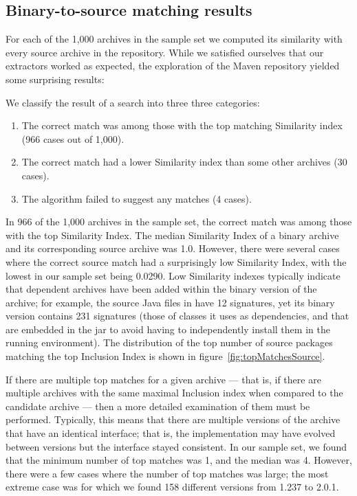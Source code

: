 \subsection{Binary-to-source matching results}

For each of the 1,000 archives in the sample set we computed its similarity
with every source archive in the repository.  While we satisfied ourselves
that our extractors worked as expected, the exploration of the Maven
repository yielded some surprising results:

We classify the result of a search into three three categories:

    \begin{enumerate}
    \item The correct match was among those with the top matching Similarity
	index (966 cases out of 1,000).
    \item The correct match had a lower Similarity index than some
	other archives (30 cases).
    \item The algorithm failed to suggest any matches (4 cases).
    \end{enumerate}

In 966 of the 1,000 archives in the sample set, the correct match was among
those with the top Similarity Index.  The median Similarity Index of a
binary archive and its corresponding source archive was 1.0.  However,
there were several cases where the correct source match had a surprisingly
low Similarity Index, with the lowest in our sample set being 0.0290.  Low
Similarity indexes typically indicate that dependent archives have been
added within the binary version of the archive; for example, the source
Java files in  have 12 signatures, yet
its binary version contains 231 signatures (those of classes it uses as
dependencies, and that are embedded in the jar to avoid having to
independently install them in the running environment).  The distribution
of the top number of source packages matching the top Inclusion Index is
shown in figure~\ref{fig:topMatchesSource}.

If there are multiple top matches for a given archive --- that is, if there
are multiple archives with the same maximal Inclusion index when compared
to the candidate archive --- then a more detailed examination of them must
be performed.  Typically, this means that there are multiple versions of
the archive that have an identical interface; that is, the implementation
may have evolved between versions but the interface stayed consistent.  In
our sample set, we found that the minimum number of top matches was 1, and
the median was 4.  However, there were a few cases where the number of top
matches was large; the most extreme case was
 for which we found 158 different
versions from 1.237 to 2.0.1.

